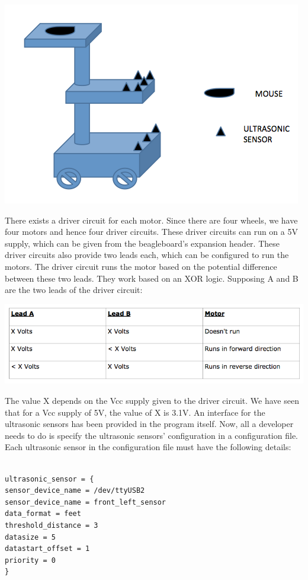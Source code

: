 \documentclass[12pt]{article}
\begin{document}
\begin{center} \includegraphics[scale=0.4]{bot} \end{center}
There exists a driver circuit for each motor. Since there are four wheels, we have four motors and hence four driver circuits. These driver circuits can run on a 5V supply, which can be given from the beagleboard's expansion header. These driver circuits also provide two leads each, which can be configured to run the motors. The driver circuit runs the motor based on the potential difference between these two leads. They work based on an XOR logic. Supposing A and B are the two leads of the driver circuit:
\begin{center} \includegraphics[scale=0.4]{table1} \end{center}
The value X depends on the Vcc supply given to the driver circuit. We have seen that for a Vcc supply of 5V, the value of X is 3.1V.
An interface for the ultrasonic sensors has been provided in the program itself. Now, all a developer needs to do is specify the ultrasonic sensors' configuration in a configuration file. Each ultrasonic sensor in the configuration file must have the following details:
\\
\\
\begin{verbatim}
ultrasonic_sensor = {
sensor_device_name = /dev/ttyUSB2 
sensor_device_name = front_left_sensor 
data_format = feet
threshold_distance = 3
datasize = 5
datastart_offset = 1
priority = 0
}
\end{verbatim}
\end{document}
